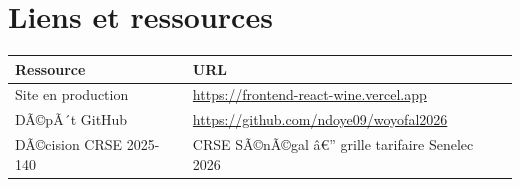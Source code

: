 \documentclass[12pt,a4paper]{report}
\begin{document}
\chapter{Liens et ressources}
\label{ann:liens}

\begin{tabular}{ll}
\toprule
Ressource & URL \\
\midrule
Site en production & \url{https://frontend-react-wine.vercel.app} \\
DÃ©pÃ´t GitHub & \url{https://github.com/ndoye09/woyofal2026} \\
DÃ©cision CRSE 2025-140 & CRSE SÃ©nÃ©gal â€” grille tarifaire Senelec 2026 \\
\bottomrule
\end{tabular}
\end{document}
